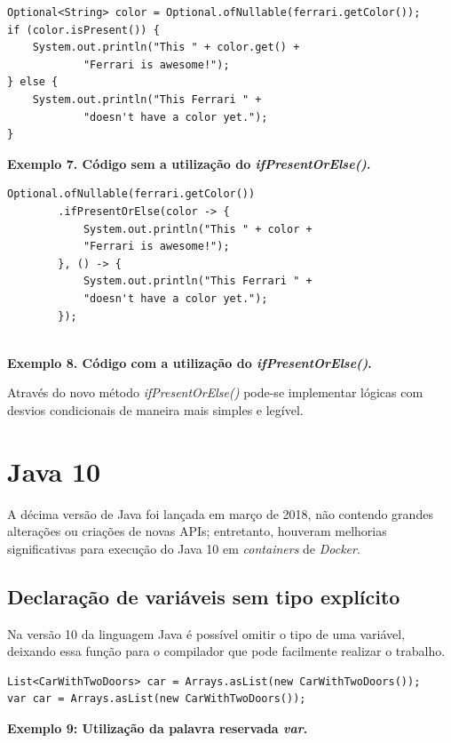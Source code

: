 \documentclass[12pt]{article}
\begin{document}
\begin{verbatim}
Optional<String> color = Optional.ofNullable(ferrari.getColor());
if (color.isPresent()) {
    System.out.println("This " + color.get() + 
            "Ferrari is awesome!");
} else {
    System.out.println("This Ferrari " + 
            "doesn't have a color yet.");
}
\end{verbatim}
\centerline{\textbf{Exemplo 7. Código sem a utilização do \textit{ifPresentOrElse()}.}}

\begin{verbatim}
Optional.ofNullable(ferrari.getColor())
        .ifPresentOrElse(color -> {
            System.out.println("This " + color + 
            "Ferrari is awesome!"); 
        }, () -> {
            System.out.println("This Ferrari " + 
            "doesn't have a color yet.");
        });
        
\end{verbatim}
\centerline{\textbf{Exemplo 8. Código com a utilização do \textit{ifPresentOrElse()}.}}
\hfill \break


Através do novo método \textit{ifPresentOrElse()} pode-se implementar lógicas com desvios condicionais de maneira mais simples e legível.

\section{Java 10}

\cite{javaDocs} A décima versão de Java foi lançada em março de 2018, não contendo grandes alterações ou criações de novas APIs; entretanto, houveram melhorias significativas para execução do Java 10 em \textit{containers} de \textit{Docker}.

\subsection{Declaração de variáveis sem tipo explícito}

Na versão 10 da linguagem Java é possível omitir o tipo de uma variável, deixando essa função para o compilador que pode facilmente realizar o trabalho.

\begin{verbatim}
List<CarWithTwoDoors> car = Arrays.asList(new CarWithTwoDoors());
var car = Arrays.asList(new CarWithTwoDoors());
\end{verbatim}
\centerline{\textbf{Exemplo 9: Utilização da palavra reservada \textit{var}.}}
\hfill \break
\end{document}
